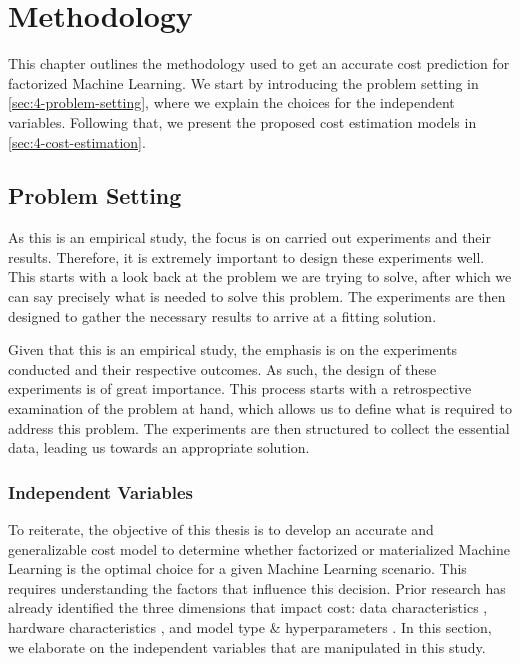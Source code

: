 
\chapter{Methodology}

\label{chapter:methodology}

This chapter outlines the methodology used to get an accurate cost prediction for factorized Machine Learning. We start by introducing the problem setting in \autoref{sec:4-problem-setting}, where we explain the choices for the independent variables. Following that, we present the proposed cost estimation models in \autoref{sec:4-cost-estimation}.

\section{Problem Setting}
\label{sec:4-problem-setting}

As this is an empirical study, the focus is on carried out experiments and their results. Therefore, it is extremely important to design these experiments well. This starts with a look back at the problem we are trying to solve, after which we can say precisely what is needed to solve this problem. The experiments are then designed to gather the necessary results to arrive at a fitting solution.

Given that this is an empirical study, the emphasis is on the experiments conducted and their respective outcomes. As such, the design of these experiments is of great importance. This process starts with a retrospective examination of the problem at hand, which allows us to define what is required to address this problem. The experiments are then structured to collect the essential data, leading us towards an appropriate solution.

\subsection{Independent Variables}
To reiterate, the objective of this thesis is to develop an accurate and generalizable cost model to determine whether factorized or materialized Machine Learning is the optimal choice for a given Machine Learning scenario. This requires understanding the factors that influence this decision. Prior research has already identified the three dimensions that impact cost: data characteristics \cite{morpheus, amalur,amalur_tkde24}, hardware characteristics \cite{orion_learning_gen_lin_models}, and model type \& hyperparameters \cite{amalur,amalur_tkde24}. In this section, we elaborate on the independent variables that are manipulated in this study.

